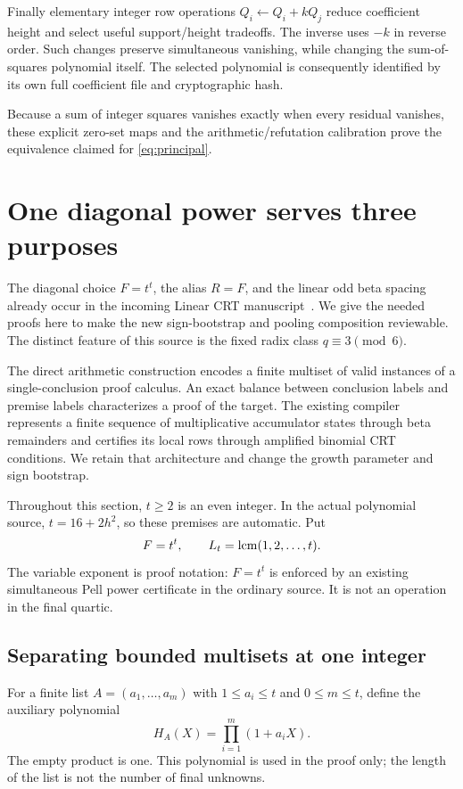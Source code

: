 \documentclass[11pt]{article}
\theoremstyle{remark}\newtheorem{remark}[theorem]{Remark}
\begin{document}
Finally elementary integer row operations $Q_i\leftarrow Q_i+kQ_j$
reduce coefficient height and select useful support/height tradeoffs.
The inverse uses $-k$ in reverse order. Such changes preserve
simultaneous vanishing, while changing the sum-of-squares polynomial
itself. The selected polynomial is consequently identified by its own
full coefficient file and cryptographic hash.

Because a sum of integer squares vanishes exactly when every residual
vanishes, these explicit zero-set maps and the arithmetic/refutation
calibration prove the equivalence claimed for \eqref{eq:principal}.



\section{One diagonal power serves three purposes}\label{sec:diagonal}

The diagonal choice $F=t^t$, the alias $R=F$, and the linear odd beta
spacing already occur in the incoming Linear CRT manuscript~\cite{linearcrt}.
We give the needed proofs here to make the new sign-bootstrap and pooling
composition reviewable. The distinct feature of this source is the fixed
radix class $q\equiv3\pmod6$.

The direct arithmetic construction encodes a finite multiset of valid
instances of a single-conclusion proof calculus. An exact balance between
conclusion labels and premise labels characterizes a proof of the target.
The existing compiler represents a finite sequence of multiplicative
accumulator states through beta remainders and certifies its local rows
through amplified binomial CRT conditions. We retain that architecture
and change the growth parameter and sign bootstrap.

Throughout this section, $t\ge2$ is an even integer. In the actual
polynomial source, $t=16+2h^2$, so these premises are automatic. Put
\[
 F=t^t,\qquad L_t=\operatorname{lcm}(1,2,\ldots,t).
\]
The variable exponent is proof notation: $F=t^t$ is enforced by an
existing simultaneous Pell power certificate in the ordinary source.
It is not an operation in the final quartic.

\subsection{Separating bounded multisets at one integer}

For a finite list $A=(a_1,\ldots,a_m)$ with $1\le a_i\le t$ and
$0\le m\le t$, define the auxiliary polynomial
\[
 H_A(X)=\prod_{i=1}^{m}(1+a_iX).
\]
The empty product is one. This polynomial is used in the proof only;
the length of the list is not the number of final unknowns.
\end{document}
